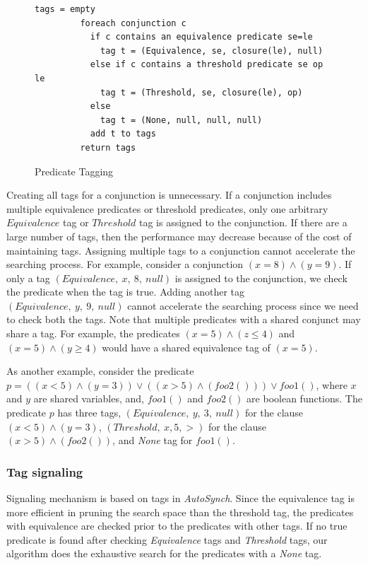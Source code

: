 \documentclass{sigplanconf}
\begin{document}
\begin{figure}[ht!]
    \begin{Verbatim}[fontsize=\footnotesize,gobble=8,frame=lines,
            framesep=3mm]
         tags = empty
         foreach conjunction c 
           if c contains an equivalence predicate se=le
             tag t = (Equivalence, se, closure(le), null)
           else if c contains a threshold predicate se op le
             tag t = (Threshold, se, closure(le), op)
           else 
             tag t = (None, null, null, null) 
           add t to tags 
         return tags
    \end{Verbatim}
  \caption{Predicate Tagging}
  \label{fig:tagging}
\end{figure}
Creating all tags for a conjunction is unnecessary. If a conjunction includes 
multiple equivalence predicates or threshold predicates, only one arbitrary 
$Equivalence$ tag or $Threshold$ tag is assigned to the conjunction. 
If there are a large number of tags, then the performance may decrease
because of the cost of maintaining tags. 
Assigning multiple tags to a 
conjunction cannot accelerate the searching process. For example, consider a 
conjunction $(x = 8) \wedge (y = 9)$. If only a tag 
$(Equivalence,\ x,\ 8,\ null)$
is assigned to the conjunction, we check the predicate when the tag is
true. Adding another tag $(Equivalence,\ y,\ 9,\ null)$ cannot accelerate the
searching process since we need to check both the tags. 
Note that multiple predicates with a shared conjunct may share a tag. 
For example, the predicates $(x=5) \wedge (z \leq 4)$ and $(x=5) \wedge (y \geq 4)$ would have a shared equivalence tag
of $(x=5)$.

As another example, consider the predicate $p = ((x < 5) \wedge (y =
3)) 
\vee ((x > 5) \wedge (foo2())) \vee foo1()$, where $x$ and $y$ are
shared variables, and, $foo1()$ and $foo2()$ are boolean functions. 
The predicate $p$ has three
tags, $(Equivalence,\ y,\ 3,\ null)$ for the clause $(x < 5) \wedge (y = 3)$, 
$(Threshold,\ x, 5, >)$ for the clause $(x > 5) \wedge (foo2())$, and 
{\em None} tag for $foo1()$.

\subsubsection{Tag signaling}
Signaling mechanism is based on tags in {\em AutoSynch}. 
Since the equivalence tag is more efficient in pruning the search space than the threshold tag, the
predicates with equivalence are checked prior to the predicates with other 
tags. If no true predicate is found after checking {\em
Equivalence} 
tags and {\em Threshold} tags, our algorithm does the exhaustive search for the 
predicates with a {\em None} tag. 
\end{document}
